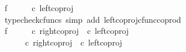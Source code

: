 \begin{isabellebody}
\ f{}{\isacharcolon}{\kern0pt}\ {\isachardoublequoteopen}{\isasymlangle}{\isasymt}{\isacharcomma}{\kern0pt}{\isasymt}{\isasymrangle}\ {\isasymamalg}\ {\isasymlangle}{\isasymt}{\isacharcomma}{\kern0pt}{\isasymf}{\isasymrangle}\ {\isasymamalg}\ {\isasymlangle}{\isasymf}{\isacharcomma}{\kern0pt}{\isasymt}{\isasymrangle}\ {\isasymcirc}\isactrlsub c\ left{\isacharunderscore}{\kern0pt}coproj\ {\isasymone}\ {\isacharparenleft}{\kern0pt}{\isasymone}\ {\isasymCoprod}\ {\isasymone}{\isacharparenright}{\kern0pt}\ {\isacharequal}{\kern0pt}\ {\isasymlangle}{\isasymt}{\isacharcomma}{\kern0pt}{\isasymt}{\isasymrangle}{\isachardoublequoteclose}\isanewline
\ \ \ \ \isamarkupfalse%
\ {\isacharparenleft}{\kern0pt}typecheck{\isacharunderscore}{\kern0pt}cfuncs{\isacharcomma}{\kern0pt}\ simp\ add{\isacharcolon}{\kern0pt}\ left{\isacharunderscore}{\kern0pt}coproj{\isacharunderscore}{\kern0pt}cfunc{\isacharunderscore}{\kern0pt}coprod{\isacharparenright}{\kern0pt}\isanewline
\ \ \isamarkupfalse%
\ f{}{\isacharcolon}{\kern0pt}\ {\isachardoublequoteopen}{\isasymlangle}{\isasymt}{\isacharcomma}{\kern0pt}{\isasymt}{\isasymrangle}\ {\isasymamalg}\ {\isasymlangle}{\isasymt}{\isacharcomma}{\kern0pt}{\isasymf}{\isasymrangle}\ {\isasymamalg}\ {\isasymlangle}{\isasymf}{\isacharcomma}{\kern0pt}{\isasymt}{\isasymrangle}\ {\isasymcirc}\isactrlsub c\ {\isacharparenleft}{\kern0pt}right{\isacharunderscore}{\kern0pt}coproj\ {\isasymone}\ {\isacharparenleft}{\kern0pt}{\isasymone}{\isasymCoprod}{\isasymone}{\isacharparenright}{\kern0pt}{\isasymcirc}\isactrlsub c\ left{\isacharunderscore}{\kern0pt}coproj\ {\isasymone}\ {\isasymone}{\isacharparenright}{\kern0pt}\ {\isacharequal}{\kern0pt}\ {\isasymlangle}{\isasymt}{\isacharcomma}{\kern0pt}{\isasymf}{\isasymrangle}{\isachardoublequoteclose}\isanewline
\ \ \isamarkupfalse%
{\isacharminus}{\kern0pt}\ \isanewline
\ \ \ \ \isamarkupfalse%
\ {\isachardoublequoteopen}{\isasymlangle}{\isasymt}{\isacharcomma}{\kern0pt}{\isasymt}{\isasymrangle}\ {\isasymamalg}\ {\isasymlangle}{\isasymt}{\isacharcomma}{\kern0pt}{\isasymf}{\isasymrangle}\ {\isasymamalg}\ {\isasymlangle}{\isasymf}{\isacharcomma}{\kern0pt}{\isasymt}{\isasymrangle}\ {\isasymcirc}\isactrlsub c\ {\isacharparenleft}{\kern0pt}right{\isacharunderscore}{\kern0pt}coproj\ {\isasymone}\ {\isacharparenleft}{\kern0pt}{\isasymone}{\isasymCoprod}{\isasymone}{\isacharparenright}{\kern0pt}{\isasymcirc}\isactrlsub c\ left{\isacharunderscore}{\kern0pt}coproj\ {\isasymone}\ {\isasymone}{\isacharparenright}{\kern0pt}\ {\isacharequal}{\kern0pt}\ \isanewline

\end{isabellebody}
